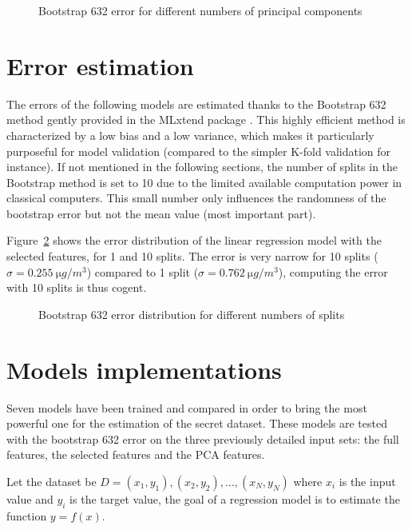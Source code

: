 \documentclass[journal,11pt]{IEEEtran}
\begin{document}
\begin{figure}[H]
    \centering
    
    \caption{Bootstrap 632 error for different numbers of principal components}
    \label{fig:error_PCA}
\end{figure}

\section{Error estimation}
\label{Error_estimation}

The errors of the following models are estimated thanks to the Bootstrap 632 method gently provided in the MLxtend package \cite{raschkas_2018_mlxtend}. This highly efficient method is characterized by a low bias and a low variance, which makes it particularly purposeful for model validation (compared to the simpler K-fold validation for instance). If not mentioned in the following sections, the number of splits in the Bootstrap method is set to 10 due to the limited available computation power in classical computers. This small number only influences the randomness of the bootstrap error but not the mean value (most important part).

Figure~\ref{fig:error_analysis_bootstrap} shows the error distribution of the linear regression model with the selected features, for 1 and 10 splits. The error is very narrow for 10 splits ($\sigma = \SI{0.255}{\micro g/m^3}$) compared to 1 split ($\sigma = \SI{0.762}{\micro g/m^3}$), computing the error with 10 splits is thus cogent.

\begin{figure}[H]
    \centering
    
    \caption{Bootstrap 632 error distribution for different numbers of splits}
    \label{fig:error_analysis_bootstrap}
\end{figure}

\section{Models implementations}
\label{Models_implementations}


Seven models have been trained and compared in order to bring the most powerful one for the estimation of the secret dataset. These models are tested with the bootstrap 632 error on the three previously detailed input sets: the full features, the selected features and the PCA features.

Let the dataset be $D = { (x_1 , y_1 ),(x_2 , y_2 ),\ldots,(x_N , y_N ) }$ where  $x_i$ is the input value and $y_i$ is the target value, the goal of a regression model is to estimate the function $y = f(x)$.
\end{document}
